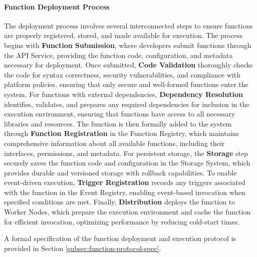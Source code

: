 \documentclass[11pt]{article}
\begin{document}
\paragraph{Function Deployment Process}
The deployment process involves several interconnected steps to ensure functions are properly registered, stored, and made available for execution. The process begins with \textbf{Function Submission}, where developers submit functions through the API Service, providing the function code, configuration, and metadata necessary for deployment. Once submitted, \textbf{Code Validation} thoroughly checks the code for syntax correctness, security vulnerabilities, and compliance with platform policies, ensuring that only secure and well-formed functions enter the system. For functions with external dependencies, \textbf{Dependency Resolution} identifies, validates, and prepares any required dependencies for inclusion in the execution environment, ensuring that functions have access to all necessary libraries and resources. The function is then formally added to the system through \textbf{Function Registration} in the Function Registry, which maintains comprehensive information about all available functions, including their interfaces, permissions, and metadata. For persistent storage, the \textbf{Storage} step securely saves the function code and configuration in the Storage System, which provides durable and versioned storage with rollback capabilities. To enable event-driven execution, \textbf{Trigger Registration} records any triggers associated with the function in the Event Registry, enabling event-based invocation when specified conditions are met. Finally, \textbf{Distribution} deploys the function to Worker Nodes, which prepare the execution environment and cache the function for efficient invocation, optimizing performance by reducing cold-start times.

A formal specification of the function deployment and execution protocol is provided in Section \ref{subsec:function-protocol-spec}.




\end{document}
